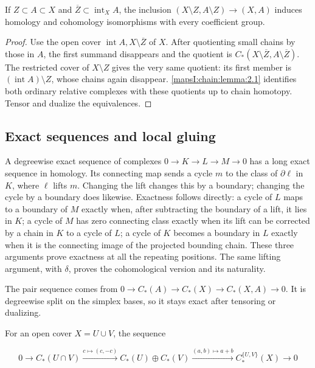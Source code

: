 \begin{corollary}[excision]
\label{mapsI:chain:corollary:2.2}
If \(Z\subset A\subset X\) and \(\overline Z\subset\operatorname{int}_X A\), the inclusion
\((X\setminus Z,A\setminus Z)\to(X,A)\)
induces homology and cohomology isomorphisms with every coefficient group.
\end{corollary}

\begin{proof}
Use the open cover \(\operatorname{int}A, X\setminus\overline Z\) of \(X\). After quotienting small chains by those in \(A\), the first summand disappears and the quotient is
\(C_*(X\setminus\overline Z,A\setminus\overline Z)\).
The restricted cover of \(X\setminus Z\) gives the very same quotient: its first member is \((\operatorname{int}A)\setminus Z\), whose chains again disappear. \cref{mapsI:chain:lemma:2.1} identifies both ordinary relative complexes with these quotients up to chain homotopy. Tensor and dualize the equivalences.
\end{proof}

\subsection{Exact sequences and local gluing}
\label{mapsI:chain:section-3}

A degreewise exact sequence of complexes \(0\to K\to L\to M\to0\) has a long exact sequence in homology. Its connecting map sends a cycle \(m\) to the class of \(\partial\ell\) in \(K\), where \(\ell\) lifts \(m\). Changing the lift changes this by a boundary; changing the cycle by a boundary does likewise. Exactness follows directly: a cycle of \(L\) maps to a boundary of \(M\) exactly when, after subtracting the boundary of a lift, it lies in \(K\); a cycle of \(M\) has zero connecting class exactly when its lift can be corrected by a chain in \(K\) to a cycle of \(L\); a cycle of \(K\) becomes a boundary in \(L\) exactly when it is the connecting image of the projected bounding chain. These three arguments prove exactness at all the repeating positions. The same lifting argument, with \(\delta\), proves the cohomological version and its naturality.

The pair sequence comes from
\(0\to C_*(A)\to C_*(X)\to C_*(X,A)\to0\).
It is degreewise split on the simplex bases, so it stays exact after tensoring or dualizing.

For an open cover \(X=U\cup V\), the sequence

\[
0\to C_*(U\cap V)\xrightarrow{c\mapsto(c,-c)}
C_*(U)\oplus C_*(V)\xrightarrow{(a,b)\mapsto a+b}
C_*^{\{U,V\}}(X)\to0
\]

